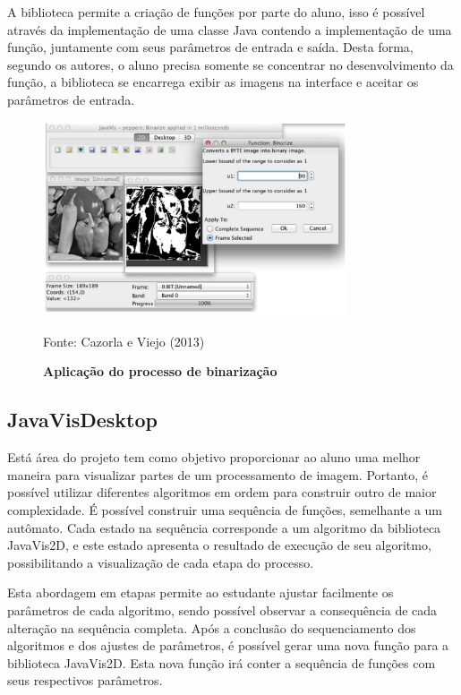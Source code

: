 \documentclass[
	12pt,				%
	oneside,			%
	a4paper,			%
	english,			%
	french,				%
	spanish,			%
	brazil,				%
	]{abntex2}
\begin{document}
A biblioteca permite a criação de funções por parte do aluno, isso é possível através da implementação de uma classe Java contendo a implementação de uma função, juntamente com seus parâmetros de entrada e saída. Desta forma, segundo os autores, o aluno precisa somente se concentrar no desenvolvimento da função, a biblioteca se encarrega exibir as imagens na interface e aceitar os parâmetros de entrada.

\begin{figure}[ht]
\centering
\caption{\textbf{Aplicação do processo de binarização }}
\includegraphics[width=0.8\textwidth]{imagens/javavis_2d.png}

Fonte: Cazorla e Viejo  (2013)
\label{fig:javavis_2d}
\end{figure}

\subsection{JavaVisDesktop}

Está área do projeto tem como objetivo proporcionar ao aluno uma melhor maneira para visualizar partes de um processamento de imagem. Portanto, é possível utilizar diferentes algoritmos em ordem para construir outro de maior complexidade. É possível construir uma sequência de funções, semelhante a um autômato. Cada estado na sequência corresponde a um algoritmo da biblioteca JavaVis2D, e este estado apresenta o resultado de execução de seu algoritmo, possibilitando a visualização de cada etapa do processo.

Esta abordagem em etapas permite ao estudante ajustar facilmente os parâmetros de cada algoritmo, sendo possível observar a consequência de cada alteração na sequência completa. Após a conclusão do sequenciamento dos algoritmos e dos ajustes de parâmetros, é possível gerar uma nova função para a biblioteca JavaVis2D. Esta nova função irá conter a sequência de funções com seus respectivos parâmetros.
\end{document}
